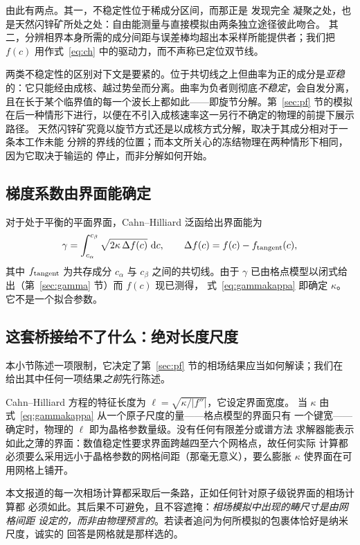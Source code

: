 \documentclass[11pt,a4paper]{ctexart}
\begin{document}
由此有两点。其一，不稳定性位于稀成分区间，而那正是 \citet{yu2026b} 发现完全
凝聚之处，也是天然闪锌矿所处之处：自由能测量与直接模拟由两条独立途径彼此吻合。
其二，分辨相界本身所需的成分间距与误差棒均超出本采样所能提供者；我们把 $f(c)$
用作式~\eqref{eq:ch} 中的驱动力，而不声称已定位双节线。

两类不稳定性的区别对下文是要紧的。位于共切线之上但曲率为正的成分是\emph{亚稳}
的：它只能经由成核、越过势垒而分离。曲率为负者则彻底\emph{不稳定}，会自发分离，
且在长于某个临界值的每一个波长上都如此——即旋节分解。第~\ref{sec:pf} 节的模拟
在后一种情形下进行，以便在不引入成核速率这一另行不确定的物理的前提下展示路径。
天然闪锌矿究竟以旋节方式还是以成核方式分解，取决于其成分相对于一条本工作未能
分辨的界线的位置；而本文所关心的冻结物理在两种情形下相同，因为它取决于输运的
停止，而非分解如何开始。

\subsection{梯度系数由界面能确定}
\label{sec:kappa}

对于处于平衡的平面界面，Cahn--Hilliard 泛函给出界面能为
\begin{equation}
\gamma = \int_{c_\alpha}^{c_\beta} \sqrt{2\kappa\, \Delta f(c)}\ \mathrm{d}c,
\qquad
\Delta f(c) = f(c) - f_{\rm tangent}(c),
\label{eq:gammakappa}
\end{equation}
其中 $f_{\rm tangent}$ 为共存成分 $c_\alpha$ 与 $c_\beta$ 之间的共切线。由于
$\gamma$ 已由格点模型以闭式给出（第~\ref{sec:gamma} 节）而 $f(c)$ 现已测得，
式~\eqref{eq:gammakappa} 即确定 $\kappa$。它不是一个拟合参数。

\subsection{这套桥接给不了什么：绝对长度尺度}
\label{sec:kappacaveat}

本小节陈述一项限制，它决定了第~\ref{sec:pf} 节的相场结果应当如何解读；我们在
给出其中任何一项结果\emph{之前}先行陈述。

Cahn--Hilliard 方程的特征长度为 $\ell = \sqrt{\kappa / |f''|}$，它设定界面宽度。
当 $\kappa$ 由式~\eqref{eq:gammakappa} 从一个原子尺度的量——格点模型的界面只有
一个键宽——确定时，物理的 $\ell$ 即为晶格参数量级。没有任何有限差分或谱方法
求解器能表示如此之薄的界面：数值稳定性要求界面跨越四至六个网格点，故任何实际
计算都必须要么采用远小于晶格参数的网格间距（那毫无意义），要么膨胀 $\kappa$
使界面在可用网格上铺开。

本文报道的每一次相场计算都采取后一条路，正如任何针对原子级锐界面的相场计算都
必须如此。其后果不可避免，且不容遮掩：\emph{相场模拟中出现的畴尺寸是由网格间距
设定的，而非由物理预言的}。若读者追问为何所模拟的包裹体恰好是纳米尺度，诚实的
回答是网格就是那样选的。
\end{document}
